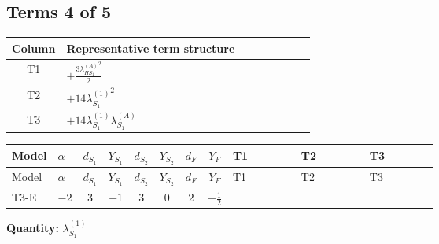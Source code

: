 \documentclass[8pt]{article}
\begin{document}
\begin{landscape}
\subsection*{Terms 4 of 5}
\begin{center}
\begin{tabular}{@{}c >{\raggedright\arraybackslash}p{0.82\linewidth}@{}}
\toprule
Column & Representative term structure \\
\midrule
T1 & \(\displaystyle +\frac{3 {\lambda_{HS_1}^{(A)}}^2}{2}\) \\
\midrule
T2 & \(\displaystyle +14 {\lambda_{S_1}^{(1)}}^2\) \\
\midrule
T3 & \(\displaystyle +14 {\lambda_{S_1}^{(1)}} {\lambda_{S_1}^{(A)}}\) \\
\midrule
\bottomrule
\end{tabular}
\end{center}
\smallskip
\tiny
\begin{longtable}{@{}llcccccc >{\raggedright\arraybackslash}p{0.21\linewidth} >{\raggedright\arraybackslash}p{0.21\linewidth} >{\raggedright\arraybackslash}p{0.21\linewidth}@{}}
\toprule
Model & $\alpha$ & $d_{S_1}$ & $Y_{S_1}$ & $d_{S_2}$ & $Y_{S_2}$ & $d_F$ & $Y_F$ & T1 & T2 & T3 \\
\midrule
\endfirsthead
\toprule
Model & $\alpha$ & $d_{S_1}$ & $Y_{S_1}$ & $d_{S_2}$ & $Y_{S_2}$ & $d_F$ & $Y_F$ & T1 & T2 & T3 \\
\midrule
\endhead
T3-E & $-2$ & $3$ & $-1$ & $3$ & $0$ & $2$ & $-\frac{1}{2}$ & \scriptsize\adjustbox{max width=\linewidth}{$\begin{gathered} +\frac{3 {\lambda_{HS_1}^{(A)}}^2}{2}\end{gathered}$} & \scriptsize\adjustbox{max width=\linewidth}{$\begin{gathered} +14 {\lambda_{S_1}^{(1)}}^2\end{gathered}$} & \scriptsize\adjustbox{max width=\linewidth}{$\begin{gathered} +14 {\lambda_{S_1}^{(1)}} {\lambda_{S_1}^{(A)}}\end{gathered}$} \\
\midrule
\bottomrule
\end{longtable}
\clearpage
\noindent\textbf{Quantity: }$\lambda_{S_1}^{(1)}$\par\smallskip

\end{landscape}
\end{document}
